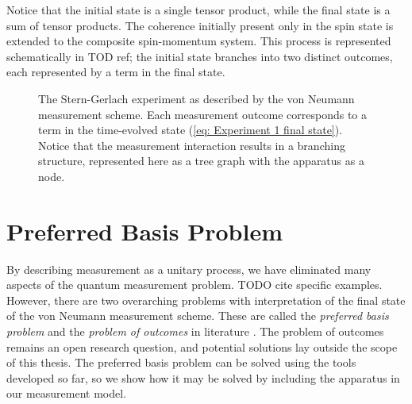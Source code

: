 Notice that the initial state is a single tensor product, while the final state is a sum of tensor products. The coherence initially present only in the spin state is extended to the composite spin-momentum system. This process is represented schematically in TOD ref; the initial state branches into two distinct outcomes, each represented by a term in the final state.

\begin{figure}
\centering\CaptionFontSize
{}

\caption[Insert an abbreviated caption here to show in the List of Figures]
{The Stern-Gerlach experiment as described by the von Neumann measurement scheme. Each measurement outcome corresponds to a term in the time-evolved state (\autoref{eq: Experiment 1 final state}). Notice that the measurement interaction results in a branching structure, represented here as a tree graph with the apparatus as a node.}
\label{Figure:Measurement:DetectorStates}
\end{figure}

\section{Preferred Basis Problem}

By describing measurement as a unitary process, we have eliminated many aspects of the quantum measurement problem. TODO cite specific examples. However, there are two overarching problems with interpretation of the final state of the von Neumann measurement scheme. These are called the \textit{preferred basis problem} and the \textit{problem of outcomes} in literature \cite{Schlosshauer}\cite{Wang}. The problem of outcomes remains an open research question, and potential solutions lay outside the scope of this thesis. The preferred basis problem can be solved using the tools developed so far, so we show how it may be solved by including the apparatus in our measurement model.

